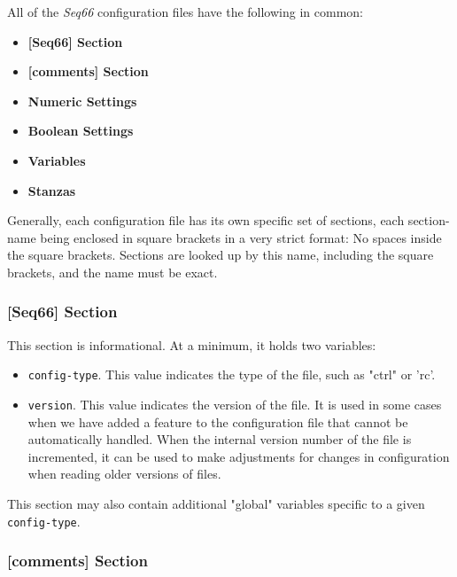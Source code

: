    All of the \textsl{Seq66} configuration files have the following in common:

   \begin{itemize}
      \item \textbf{[Seq66] Section}
      \item \textbf{[comments] Section}
      \item \textbf{Numeric Settings}
      \item \textbf{Boolean Settings}
      \item \textbf{Variables}
      \item \textbf{Stanzas}
   \end{itemize}

   Generally, each configuration file has its own specific set
   of sections, each section-name being enclosed in square brackets in a very
   strict format:  No spaces inside the square brackets.  Sections are looked up
   by this name, including the square brackets, and the name must be exact.

\subsubsection{[Seq66] Section}
\label{subsec:configuration_common_seq66_section}

   This section is informational.  At a minimum, it holds two
   variables:

   \begin{itemize}
      \item \texttt{config-type}.  This value indicates the type of the file,
      such as "ctrl" or 'rc'.
      \item \texttt{version}.  This value indicates the version of the file.
      It is used in some cases when we have added a feature to the
      configuration file that cannot be automatically handled.
      When the internal version number of the file is incremented,
      it can be used to make adjustments for changes in configuration when
      reading older versions of files.
   \end{itemize}

   This section may also contain additional "global"
   variables specific to a given \texttt{config-type}.

\subsubsection{[comments] Section}
\label{subsec:configuration_common_comments_section}

